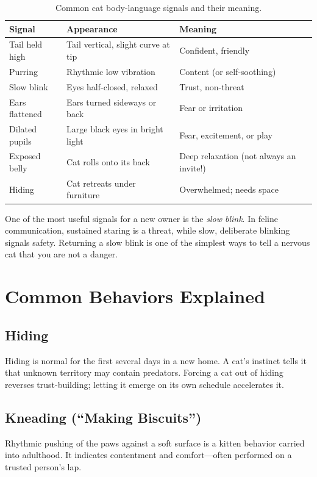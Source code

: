 \documentclass[12pt,a4paper]{article}
\begin{document}
\begin{table}[h]
\centering
\caption{Common cat body-language signals and their meaning.}
\label{tab:body}
\begin{tabular}{@{}lll@{}}
\toprule
\textbf{Signal} & \textbf{Appearance} & \textbf{Meaning} \\
\midrule
Tail held high & Tail vertical, slight curve at tip & Confident, friendly \\
Purring & Rhythmic low vibration & Content (or self-soothing) \\
Slow blink & Eyes half-closed, relaxed & Trust, non-threat \\
Ears flattened & Ears turned sideways or back & Fear or irritation \\
Dilated pupils & Large black eyes in bright light & Fear, excitement, or play \\
Exposed belly & Cat rolls onto its back & Deep relaxation (not always an invite!) \\
Hiding & Cat retreats under furniture & Overwhelmed; needs space \\
\bottomrule
\end{tabular}
\end{table}

One of the most useful signals for a new owner is the \emph{slow blink}. In feline
communication, sustained staring is a threat, while slow, deliberate blinking signals
safety. Returning a slow blink is one of the simplest ways to tell a nervous cat that
you are not a danger.

\section{Common Behaviors Explained}
\subsection{Hiding}
Hiding is normal for the first several days in a new home. A cat's instinct tells it
that unknown territory may contain predators. Forcing a cat out of hiding reverses
trust-building; letting it emerge on its own schedule accelerates it.

\subsection{Kneading (``Making Biscuits'')}
Rhythmic pushing of the paws against a soft surface is a kitten behavior carried into
adulthood. It indicates contentment and comfort---often performed on a trusted person's
lap.
\end{document}
